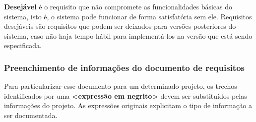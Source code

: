\textbf{Desejável} é o requisito que não compromete as funcionalidades 
básicas do sistema, isto é, o sistema pode funcionar de forma 
satisfatória sem ele. Requisitos desejáveis são requisitos que podem 
ser deixados para versões posteriores do sistema, caso não haja tempo 
hábil para implementá-los na versão que está sendo especificada.


\subsubsection{Preenchimento de informações do documento de requisitos}

Para particularizar esse documento para um determinado projeto, os trechos 
identificados por uma \textbf{<expressão em negrito>} devem ser substituídos 
pelas informações do projeto. As expressões originais explicitam o tipo de 
informação a ser documentada.

